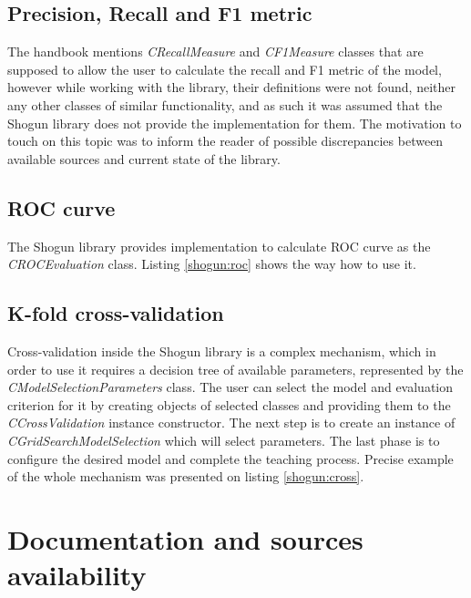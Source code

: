 \subsection{Precision, Recall and F1 metric}

The \cite{handsOnMachineLearning} handbook mentions \textit{CRecallMeasure} and \textit{CF1Measure} classes that are supposed to allow the user to calculate the recall and F1 metric of the model, however while working with the library, their definitions were not found, neither any other classes of similar functionality, and as such it was assumed that the Shogun library does not provide the implementation for them. The motivation to touch on this topic was to inform the reader of possible discrepancies between available sources and current state of the library. 

\subsection{ROC curve}

The Shogun library provides implementation to calculate ROC curve as the \textit{CROCEvaluation} class. Listing \ref{shogun:roc} shows the way how to use it.


\subsection{K-fold cross-validation}

Cross-validation inside the Shogun library is a complex mechanism, which in order to use it requires a decision tree of available parameters, represented by the \textit{CModelSelectionParameters} class. The user can select the model and evaluation criterion for it by creating objects of selected classes and providing them to the \textit{CCrossValidation} instance constructor. The next step is to create an instance of \textit{CGridSearchModelSelection} which will select parameters. The last phase is to configure the desired model and complete the teaching process. Precise example of the whole mechanism was presented on listing \ref{shogun:cross}.


\section{Documentation and sources availability}

